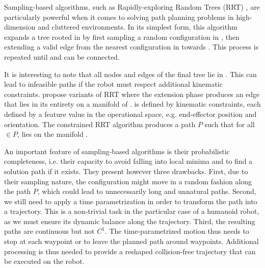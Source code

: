 Sampling-based algorithms, such as Rapidly-exploring Random Trees
(RRT) \cite{kuff00}, are particularly powerful when it comes to
solving path planning problems in high-dimension \cspace\thinspace and
cluttered environments. In its simplest form, this algorithm expands a
tree \ctree rooted in  by first sampling a random
configuration  in \cspace, then extending a valid edge
from the nearest configuration  in \ctree towards
. This process is repeated until \ctree and 
can be connected.


It is interesting to note that all nodes and edges of the final tree
\ctree lie in \cspace. This can lead to infeasible paths if the robot
must respect additional kinematic constraints. \cite{dali09,
  berenson09, stilman2007tcm} propose variants of RRT where the
extension phase produces an edge that lies in its entirety on a
manifold \manifold of \cspace. \manifold is defined by kinematic
constraints, each defined by a feature value in the operational space,
e.g. end-effector position and orientation. The constrained RRT
algorithm produces a path $P$ such that for all \config{} $\in P$,
\config{} lies on the manifold \manifold.

An important feature of sampling-based algorithms is their
probabilistic completeness, i.e. their capacity to avoid falling into
local minima and to find a solution path if it exists. They present
however three drawbacks. First, due to their sampling nature, the
configuration \config{} might move in a random fashion along the path
$P$, which could lead to unnecessarily long and unnatural
paths. Second, we still need to apply a time parametrization in order
to transform the path into a trajectory. This is a non-trivial task in
the particular case of a humanoid robot, as we must ensure its dynamic
balance along the trajectory. Third, the resulting paths are
continuous but not $C^1$. The time-parametrized motion thus needs to
stop at each waypoint or to leave the planned path around waypoints.
Additional processing is thus needed to provide a reshaped
collision-free trajectory that can be executed on the robot.

